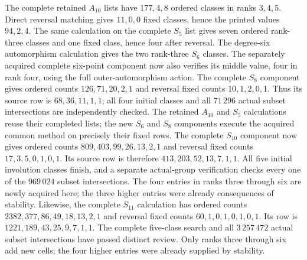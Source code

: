 \documentclass[11pt]{article}
\begin{document}
The complete retained $A_{10}$ lists have $177,4,8$ ordered classes
in ranks $3,4,5$. Direct reversal matching gives $11,0,0$ fixed
classes, hence the printed values $94,2,4$. The same calculation
on the complete $S_5$ list gives seven ordered rank-three classes
and one fixed class, hence four after reversal. The degree-six automorphism calculation gives the two rank-three
$S_6$ classes. The separately acquired complete six-point component
now also verifies its middle value, four in rank four, using the full
outer-automorphism action. The complete $S_8$ component gives ordered
counts $126,71,20,2,1$ and reversal fixed counts $10,1,2,0,1$.
Thus its source row is $68,36,11,1,1$; all four initial classes and
all $71\,296$ actual subset intersections are independently checked.
The retained $A_{10}$ and $S_5$ calculations reuse their completed
lists; the new $S_6$ and $S_8$ components execute the acquired common
method on precisely their fixed rows. The complete $S_{10}$ component
now gives ordered counts $809,403,99,26,13,2,1$ and reversal fixed counts
$17,3,5,0,1,0,1$. Its source row is therefore $413,203,52,13,7,1,1$.
All five initial involution classes finish, and a separate actual-group
verification checks every one of the $969\,024$ subset intersections.
The four entries in ranks three through six are newly acquired here;
the three higher entries were already consequences of stability.
Likewise, the complete $S_{11}$ calculation has ordered counts
$2382,377,86,49,18,13,2,1$ and reversal fixed counts
$60,1,0,1,0,1,0,1$. Its row is
$1221,189,43,25,9,7,1,1$. The complete five-class search and all
$3\,257\,472$ actual subset intersections have passed distinct review.
Only ranks three through six add new cells; the four higher entries
were already supplied by stability.
\end{document}
